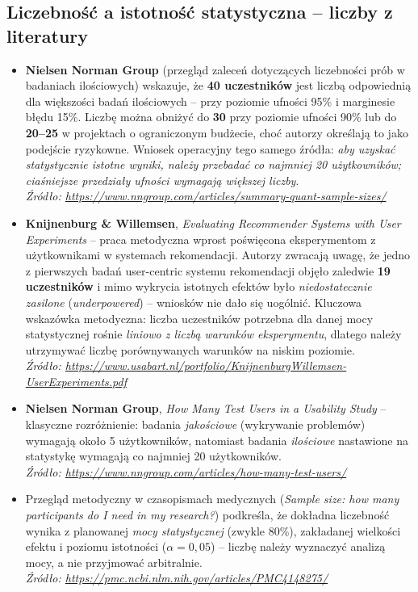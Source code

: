 \documentclass[12pt,a4paper]{article}
\begin{document}
\subsection*{Liczebność a istotność statystyczna -- liczby z literatury}

\begin{itemize}
\item \textbf{Nielsen Norman Group} (przegląd zaleceń dotyczących liczebności prób w badaniach ilościowych) wskazuje, że \textbf{40 uczestników} jest liczbą odpowiednią dla większości badań ilościowych -- przy poziomie ufności 95\% i marginesie błędu 15\%. Liczbę można obniżyć do \textbf{30} przy poziomie ufności 90\% lub do \textbf{20--25} w projektach o ograniczonym budżecie, choć autorzy określają to jako podejście ryzykowne. Wniosek operacyjny tego samego źródła: \emph{aby uzyskać statystycznie istotne wyniki, należy przebadać co najmniej 20 użytkowników; ciaśniejsze przedziały ufności wymagają większej liczby}.
\\ \textit{Źródło: \url{https://www.nngroup.com/articles/summary-quant-sample-sizes/}}

\item \textbf{Knijnenburg \& Willemsen}, \emph{Evaluating Recommender Systems with User Experiments} -- praca metodyczna wprost poświęcona eksperymentom z użytkownikami w systemach rekomendacji. Autorzy zwracają uwagę, że jedno z pierwszych badań user-centric systemu rekomendacji objęło zaledwie \textbf{19 uczestników} i mimo wykrycia istotnych efektów było \emph{niedostatecznie zasilone} (\emph{underpowered}) -- wniosków nie dało się uogólnić. Kluczowa wskazówka metodyczna: liczba uczestników potrzebna dla danej mocy statystycznej rośnie \emph{liniowo z liczbą warunków eksperymentu}, dlatego należy utrzymywać liczbę porównywanych warunków na niskim poziomie.
\\ \textit{Źródło: \url{https://www.usabart.nl/portfolio/KnijnenburgWillemsen-UserExperiments.pdf}}

\item \textbf{Nielsen Norman Group}, \emph{How Many Test Users in a Usability Study} -- klasyczne rozróżnienie: badania \emph{jakościowe} (wykrywanie problemów) wymagają około 5 użytkowników, natomiast badania \emph{ilościowe} nastawione na statystykę wymagają co najmniej 20 użytkowników.
\\ \textit{Źródło: \url{https://www.nngroup.com/articles/how-many-test-users/}}

\item Przegląd metodyczny w czasopismach medycznych (\emph{Sample size: how many participants do I need in my research?}) podkreśla, że dokładna liczebność wynika z planowanej \emph{mocy statystycznej} (zwykle 80\%), zakładanej wielkości efektu i poziomu istotności ($\alpha = 0{,}05$) -- liczbę należy wyznaczyć analizą mocy, a nie przyjmować arbitralnie.
\\ \textit{Źródło: \url{https://pmc.ncbi.nlm.nih.gov/articles/PMC4148275/}}
\end{itemize}
\end{document}
